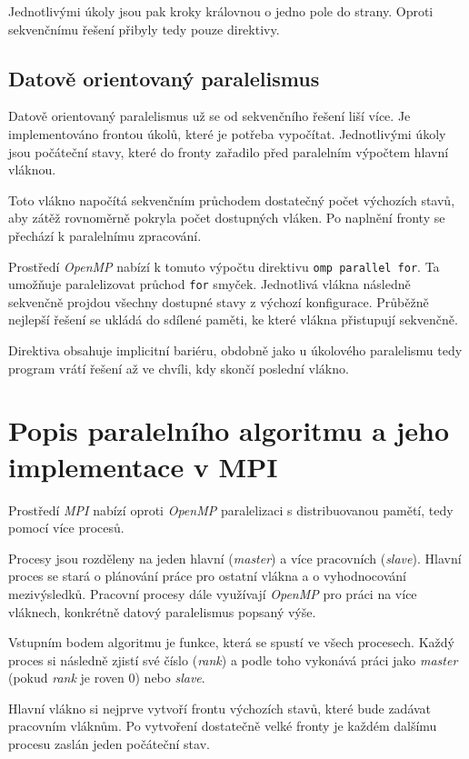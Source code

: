 \documentclass[czech]{article}
\begin{document}
Jednotlivými úkoly jsou pak kroky královnou o jedno pole do strany.
Oproti sekvenčnímu řešení přibyly tedy pouze direktivy.

\subsection{Datově orientovaný paralelismus}

Datově orientovaný paralelismus už se od sekvenčního řešení liší více.
Je implementováno frontou úkolů, které je potřeba vypočítat.
Jednotlivými úkoly jsou počáteční stavy, které do fronty zařadilo před paralelním výpočtem hlavní vláknou.

Toto vlákno napočítá sekvenčním průchodem dostatečný počet výchozích stavů, aby zátěž rovnoměrně pokryla počet dostupných vláken.
Po naplnění fronty se přechází k paralelnímu zpracování.

Prostředí \textit{OpenMP} nabízí k tomuto výpočtu direktivu \texttt{omp parallel for}.
Ta umožňuje paralelizovat průchod \texttt{for} smyček.
Jednotlivá vlákna následně sekvenčně projdou všechny dostupné stavy z výchozí konfigurace.
Průběžně nejlepší řešení se ukládá do sdílené paměti, ke které vlákna přistupují sekvenčně.

Direktiva obsahuje implicitní bariéru, obdobně jako u úkolového paralelismu tedy program vrátí řešení až ve chvíli, kdy skončí poslední vlákno.

\section{Popis paralelního algoritmu a jeho implementace v MPI}

Prostředí \textit{MPI} nabízí oproti \textit{OpenMP} paralelizaci s distribuovanou pamětí, tedy pomocí více procesů.

Procesy jsou rozděleny na jeden hlavní (\textit{master}) a více pracovních (\textit{slave}).
Hlavní proces se stará o plánování práce pro ostatní vlákna a o vyhodnocování mezivýsledků.
Pracovní procesy dále využívají \textit{OpenMP} pro práci na více vláknech, konkrétně datový paralelismus popsaný výše.

Vstupním bodem algoritmu je funkce, která se spustí ve všech procesech.
Každý proces si následně zjistí své číslo (\textit{rank}) a podle toho vykonává práci jako \textit{master} (pokud \textit{rank} je roven 0) nebo \textit{slave}.

Hlavní vlákno si nejprve vytvoří frontu výchozích stavů, které bude zadávat pracovním vláknům.
Po vytvoření dostatečně velké fronty je každém dalšímu procesu zaslán jeden počáteční stav.
\end{document}
